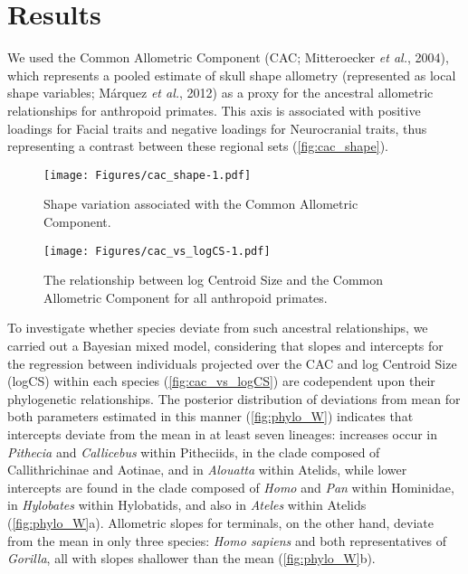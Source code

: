 \documentclass[12pt,]{article}
\begin{document}
\section{Results}\label{results}

We used the Common Allometric Component (CAC; Mitteroecker \emph{et
al.}, 2004), which represents a pooled estimate of skull shape allometry
(represented as local shape variables; Márquez \emph{et al.}, 2012) as a
proxy for the ancestral allometric relationships for anthropoid
primates. This axis is associated with positive loadings for Facial
traits and negative loadings for Neurocranial traits, thus representing
a contrast between these regional sets (\autoref{fig:cac_shape}).

\begin{figure}[htbp]
\centering
\texttt{[image: Figures/cac\_shape-1.pdf]}
\caption{Shape variation associated with the Common Allometric
Component. \label{fig:cac_shape}}
\end{figure}

\begin{figure}[htbp]
\centering
\texttt{[image: Figures/cac\_vs\_logCS-1.pdf]}
\caption{The relationship between log Centroid Size and the Common
Allometric Component for all anthropoid primates.
\label{fig:cac_vs_logCS}}
\end{figure}

To investigate whether species deviate from such ancestral
relationships, we carried out a Bayesian mixed model, considering that
slopes and intercepts for the regression between individuals projected
over the CAC and log Centroid Size (logCS) within each species
(\autoref{fig:cac_vs_logCS}) are codependent upon their phylogenetic
relationships. The posterior distribution of deviations from mean for
both parameters estimated in this manner (\autoref{fig:phylo_W})
indicates that intercepts deviate from the mean in at least seven
lineages: increases occur in \emph{Pithecia} and \emph{Callicebus}
within Pitheciids, in the clade composed of Callithrichinae and Aotinae,
and in \emph{Alouatta} within Atelids, while lower intercepts are found
in the clade composed of \emph{Homo} and \emph{Pan} within Hominidae, in
\emph{Hylobates} within Hylobatids, and also in \emph{Ateles} within
Atelids (\autoref{fig:phylo_W}a). Allometric slopes for terminals, on
the other hand, deviate from the mean in only three species: \emph{Homo
sapiens} and both representatives of \emph{Gorilla}, all with slopes
shallower than the mean (\autoref{fig:phylo_W}b).
\end{document}

